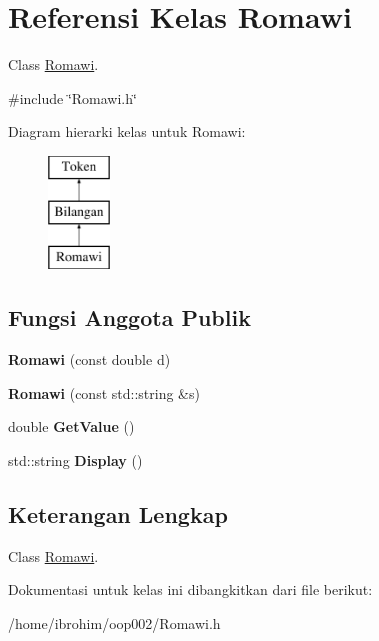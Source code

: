 \hypertarget{classRomawi}{}\section{Referensi Kelas Romawi}
\label{classRomawi}


Class \hyperlink{classRomawi}{Romawi}.  




{\ttfamily \#include \char`\"{}Romawi.\+h\char`\"{}}

Diagram hierarki kelas untuk Romawi\+:\begin{figure}[H]
\begin{center}
\leavevmode
\includegraphics[height=3.000000cm]{d9/de3/classRomawi}
\end{center}
\end{figure}
\subsection*{Fungsi Anggota Publik}
\begin{DoxyCompactItemize}
\item 
\hypertarget{classRomawi_ad246367c51d3d67d4fbaaee36031ccd1}{}{\bfseries Romawi} (const double d)\label{classRomawi_ad246367c51d3d67d4fbaaee36031ccd1}

\item 
\hypertarget{classRomawi_a46332c134c2f38feb7787994bd99e3ad}{}{\bfseries Romawi} (const std\+::string \&s)\label{classRomawi_a46332c134c2f38feb7787994bd99e3ad}

\item 
\hypertarget{classRomawi_adc5a0a8e2ad13902f66da32e5ebe2bfe}{}double {\bfseries Get\+Value} ()\label{classRomawi_adc5a0a8e2ad13902f66da32e5ebe2bfe}

\item 
\hypertarget{classRomawi_a630b1a4635acfaa7a3def12b5a6aaecc}{}std\+::string {\bfseries Display} ()\label{classRomawi_a630b1a4635acfaa7a3def12b5a6aaecc}

\end{DoxyCompactItemize}


\subsection{Keterangan Lengkap}
Class \hyperlink{classRomawi}{Romawi}. 

Dokumentasi untuk kelas ini dibangkitkan dari file berikut\+:\begin{DoxyCompactItemize}
\item 
/home/ibrohim/oop002/Romawi.\+h\end{DoxyCompactItemize}
